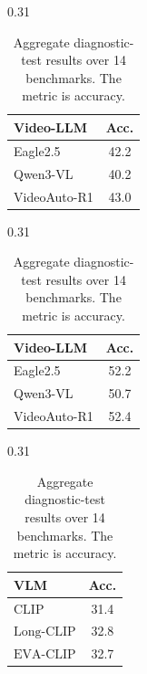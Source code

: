 \documentclass[runningheads]{llncs}
\begin{document}
{\begin{table}[h]
            \vspace{0.2em} 
        
            \begin{subtable}[t]{0.31\textwidth}
                \centering
                \begin{tabular}{lc}
                    \toprule
                    \rowcolor[gray]{0.9} \textbf{Video-LLM} & \textbf{Acc.} \\
                    \midrule
                    Eagle2.5 & 42.2 \\
                    Qwen3-VL & 40.2 \\
                    VideoAuto-R1 & 43.0 \\
                    \bottomrule
                \end{tabular}
                \caption{Center-Frame}
            \end{subtable}
            \hfill
            \begin{subtable}[t]{0.31\textwidth}
                \centering
                \begin{tabular}{lc}
                    \toprule
                    \rowcolor[gray]{0.9} \textbf{Video-LLM} & \textbf{Acc.} \\
                    \midrule
                    Eagle2.5 & 52.2 \\
                    Qwen3-VL & 50.7 \\
                    VideoAuto-R1 & 52.4 \\
                    \bottomrule
                \end{tabular}
                \caption{Frame Shuffling}
            \end{subtable}
            \hfill
            \begin{subtable}[t]{0.31\textwidth}
                \centering
                \begin{tabular}{lc}
                    \toprule
                    \rowcolor[gray]{0.9} \textbf{VLM} & \textbf{Acc.} \\
                    \midrule
                    $\text{CLIP}$ & 31.4 \\
                    $\text{Long-CLIP}$ & 32.8 \\
                    $\text{EVA-CLIP}$ & 32.7 \\
                    \bottomrule
                \end{tabular}
                \caption{Bag-of-Frames}
            \end{subtable}
            \caption{Aggregate diagnostic-test results over 14 benchmarks. The metric is accuracy.} \vspace{-10mm}
            \label{tab:main2}
        \end{table}
    
}
\end{document}
